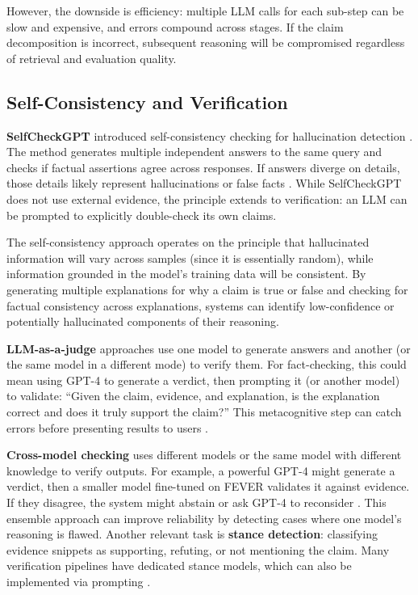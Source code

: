 \documentclass[12pt,a4paper]{article}
\begin{document}
However, the downside is efficiency: multiple LLM calls for each sub-step can be slow and expensive, and errors compound across stages. If the claim decomposition is incorrect, subsequent reasoning will be compromised regardless of retrieval and evaluation quality.

\subsection{Self-Consistency and Verification}

\textbf{SelfCheckGPT} introduced self-consistency checking for hallucination detection \citep{manakul2023selfcheckgpt}. The method generates multiple independent answers to the same query and checks if factual assertions agree across responses. If answers diverge on details, those details likely represent hallucinations or false facts \citep{manakul2023selfcheckgpt, wardle2017information}. While SelfCheckGPT does not use external evidence, the principle extends to verification: an LLM can be prompted to explicitly double-check its own claims.

The self-consistency approach operates on the principle that hallucinated information will vary across samples (since it is essentially random), while information grounded in the model's training data will be consistent. By generating multiple explanations for why a claim is true or false and checking for factual consistency across explanations, systems can identify low-confidence or potentially hallucinated components of their reasoning.

\textbf{LLM-as-a-judge} approaches use one model to generate answers and another (or the same model in a different mode) to verify them. For fact-checking, this could mean using GPT-4 to generate a verdict, then prompting it (or another model) to validate: ``Given the claim, evidence, and explanation, is the explanation correct and does it truly support the claim?'' This metacognitive step can catch errors before presenting results to users \citep{raschka2025llmeval, ruder2025llmeval}.

\textbf{Cross-model checking} uses different models or the same model with different knowledge to verify outputs. For example, a powerful GPT-4 might generate a verdict, then a smaller model fine-tuned on FEVER validates it against evidence. If they disagree, the system might abstain or ask GPT-4 to reconsider \citep{aly2021feverous}. This ensemble approach can improve reliability by detecting cases where one model's reasoning is flawed. Another relevant task is \textbf{stance detection}: classifying evidence snippets as supporting, refuting, or not mentioning the claim. Many verification pipelines have dedicated stance models, which can also be implemented via prompting \citep{thorne2018fever}.
\end{document}
